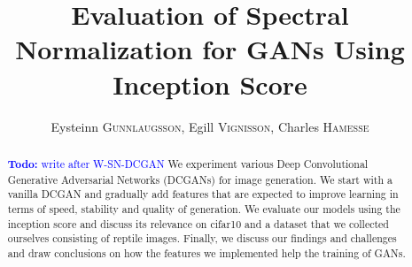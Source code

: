 \documentclass[runningheads]{llncs}
\newcommand{\todo}[1]{\textcolor{blue}{\textbf{Todo: }#1}}
\begin{document}
\pagestyle{headings}
\mainmatter

%
\def\ECCV16SubNumber{16}
\def\GroupNumber{16}
\title{Evaluation of Spectral Normalization for GANs Using Inception Score}
\author{Eysteinn \textsc{Gunnlaugsson},
	Egill \textsc{Vignisson},
	Charles \textsc{Hamesse}}
\institute{Group \GroupNumber}
\maketitle

%
\begin{abstract} \todo{write after W-SN-DCGAN} We experiment various Deep Convolutional Generative Adversarial Networks (DCGANs) for image generation. We start with a vanilla DCGAN and gradually add features that are expected to improve learning in terms of speed, stability and quality of generation. We evaluate our models using the inception score and discuss its relevance on cifar10 and a dataset that we collected ourselves consisting of reptile images. Finally, we discuss our findings and challenges and draw conclusions on how the features we implemented help the training of GANs.
{}
\end{abstract}

%






%






\end{document}
